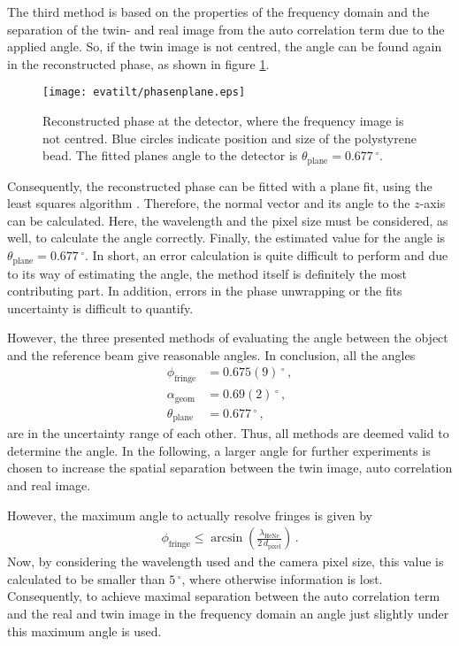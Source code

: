 \documentclass{article}
\begin{document}
The third method is based on the properties of the frequency domain and the separation of the twin- and real image from the auto correlation term due to the applied angle. So, if the twin image is not centred, the angle can be found again in the reconstructed phase, as shown in figure \ref{fig:phasenplane}.
\begin{figure}[h!]
    \centering
    \texttt{[image: evatilt/phasenplane.eps]}
    \caption{Reconstructed phase at the detector, where the frequency image is not centred. Blue circles indicate position and size of the polystyrene bead. The fitted planes angle to the detector is $\theta_\text{plane}=0.677\,^\circ$.}
    \label{fig:phasenplane}
\end{figure}
Consequently, the reconstructed phase can be fitted with a plane fit, using the least squares algorithm \cite{plane_fit}. Therefore, the normal vector and its angle to the $z$-axis can be calculated. Here, the wavelength and the pixel size must be considered, as well, to calculate the angle correctly. Finally, the estimated value for the angle is $\theta_\text{plane}=0.677\,^\circ$. In short, an error calculation is quite difficult to perform and due to its way of estimating the angle, the method itself is definitely the most contributing part. In addition, errors in the phase unwrapping or the fits uncertainty is difficult to quantify. 

However, the three presented methods of evaluating the angle between the object and the reference beam give reasonable angles. In conclusion, all the angles
\begin{align*}
    \phi_\text{fringe}&=0.675(9)\,^\circ\,,\\
    \alpha_\text{geom}&=0.69(2)\,^\circ\,,\\
    \theta_\text{plane}&=0.677\,^\circ\,,
\end{align*}
are in the uncertainty range of each other. Thus, all methods are deemed valid to determine the angle. In the following, a larger angle for further experiments is chosen to increase the spatial separation between the twin image, auto correlation and real image.

However, the maximum angle to actually resolve fringes is given by \cite{Verrier:11}
\begin{align}
    \phi_\text{fringe}\leq \arcsin\left( \frac{\lambda_\text{HeNe}}{2\,d_\text{pixel}}\right)\,. \label{eq:maxangle}
\end{align}
Now, by considering the wavelength used and the camera pixel size, this value is calculated to be smaller than $5\,^\circ$, where otherwise information is lost. Consequently, to achieve maximal separation between the auto correlation term and the real and twin image in the frequency domain an angle just slightly under this maximum angle is used.
\end{document}
